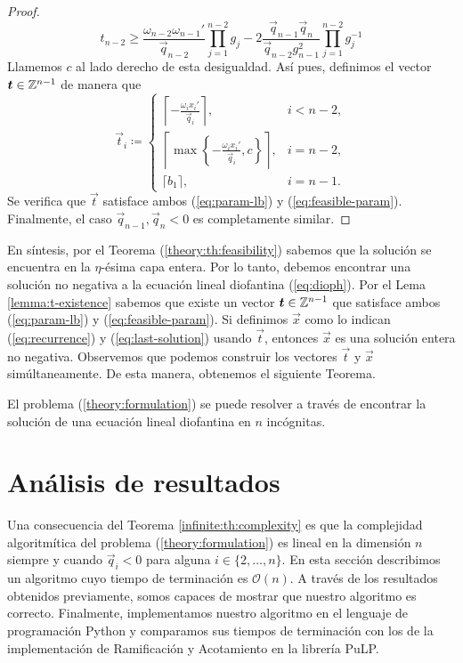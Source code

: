 \begin{proof}
	\begin{equation*}
		t_{n-2} \geq \frac{\omega_{n-2}\omega_{n-1}'}{\vec{q}_{n-2}}\prod_{j=1}^{n-2}g_j
		- 2\frac{\vec{q}_{n-1}\vec{q}_n}{\vec{q}_{n-2}g_{n-1}^2}
		\prod_{j=1}^{n-2}g_j^{-1}
	\end{equation*}
	Llamemos $c$ al lado derecho de esta desigualdad. Así pues, definimos el vector
	$\boldsymbol{t} \in \mathbb{Z}^{n-1}$ de manera que
	\begin{equation*}
		\vec{t}_i \coloneq \begin{cases}
			\left\lceil -\frac{\omega_i x_i'}{\vec{q}_i} \right\rceil, & i < n - 2, \\[1em]
			\left\lceil \max\left\lbrace -\frac{\omega_ix_i'}{\vec{q}_i}, c \right\rbrace
			\right\rceil, & i = n -2, \\[0.8em]
			\lceil b_1 \rceil, & i = n - 1.
		\end{cases}
	\end{equation*}
	Se verifica que $\vec{t}$ satisface ambos (\ref{eq:param-lb}) y (\ref{eq:feasible-param}).
	Finalmente, el caso $\vec{q}_{n-1}, \vec{q}_n < 0$ es completamente similar.
\end{proof}

En síntesis, por el Teorema (\ref{theory:th:feasibility}) sabemos que la solución se encuentra en
la $\eta$-ésima capa entera. Por lo tanto, debemos encontrar una solución no negativa a la ecuación
lineal diofantina (\ref{eq:dioph}). Por el Lema \ref{lemma:t-existence} sabemos que existe un vector
$\boldsymbol{t} \in \mathbb{Z}^{n-1}$ que satisface ambos (\ref{eq:param-lb}) y (\ref{eq:feasible-param}). Si
definimos $\vec{x}$ como lo indican (\ref{eq:recurrence}) y (\ref{eq:last-solution}) usando
$\vec{t}$, entonces $\vec{x}$ es una solución entera no negativa. Observemos que podemos construir
los vectores $\vec{t}$ y $\vec{x}$ simúltaneamente. De esta manera, obtenemos el siguiente Teorema.

\begin{theorem}
	\label{infinite:th:complexity}
	El problema (\ref{theory:formulation}) se puede resolver a través de encontrar la solución de
	una ecuación lineal diofantina en $n$ incógnitas.
\end{theorem}

\section{Análisis de resultados}
\noindent
Una consecuencia del Teorema \ref{infinite:th:complexity} es que la complejidad algoritmítica del
problema (\ref{theory:formulation}) es lineal en la dimensión $n$ siempre y cuando $\vec{q}_i < 0$
para alguna $i \in \lbrace 2, \ldots, n\rbrace$. En esta sección describimos un algoritmo cuyo
tiempo de terminación es $\mathcal{O}(n)$. A través de los resultados obtenidos previamente, somos
capaces de mostrar que nuestro algoritmo es correcto. Finalmente, implementamos nuestro algoritmo en
el lenguaje de programación Python y comparamos sus tiempos de terminación con los de la
implementación de Ramificación y Acotamiento en la librería PuLP. 
